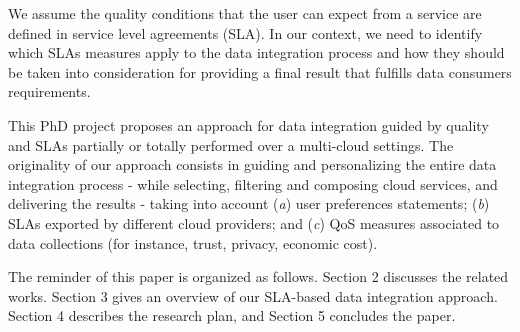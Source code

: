 We assume the quality conditions that the user can expect from a service are defined in
 service level agreements (SLA). 
In our context, we need to identify which SLAs measures apply to the data integration process and how they should be taken into consideration for providing a final result that fulfills data consumers requirements.
%
%
%

This PhD project proposes 
an approach for data integration guided by quality and SLAs partially or totally performed over a multi-cloud settings.  The originality of our approach consists in guiding and personalizing
the entire data integration process - while selecting, filtering and composing
cloud services, and delivering the results - taking into account (\textit{a})
user preferences statements; (\textit{b}) SLAs exported by different
cloud providers; and (\textit{c}) QoS measures associated to data
collections (for instance, trust, privacy, economic cost).    

The reminder of this paper is organized as follows.
Section 2 discusses the related works.
Section 3 gives an overview of our SLA-based data integration approach.
Section 4 describes the research plan, and  Section 5 concludes the paper.

